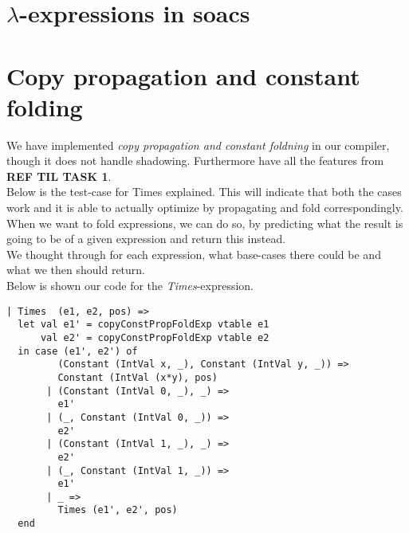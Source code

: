 \documentclass[paper=a4, fontsize=11pt]{scrartcl} %
\numberwithin{equation}{section} %
\numberwithin{figure}{section} %
\numberwithin{table}{section} %
\begin{document}
\section{$\lambda$-expressions in soacs}

\section{Copy propagation and constant folding}

	We have implemented \textit{copy propagation and constant foldning} in our compiler, though it does not handle shadowing. Furthermore have all the features from \textbf{REF TIL TASK 1}.\\
Below is the test-case for Times  explained. This will indicate that both the cases work and it is able to actually optimize by propagating and fold correspondingly.\\

When we want to fold expressions, we can do so, by predicting what the result is going to be of a given expression and return this instead.\\
We thought through for each expression, what base-cases there could be and what we then should return.\\

Below is shown our code for the \textit{Times}-expression. 
\begin{lstlisting}
| Times  (e1, e2, pos) =>
  let val e1' = copyConstPropFoldExp vtable e1
      val e2' = copyConstPropFoldExp vtable e2
  in case (e1', e2') of
         (Constant (IntVal x, _), Constant (IntVal y, _)) =>
         Constant (IntVal (x*y), pos)
       | (Constant (IntVal 0, _), _) =>
         e1'
       | (_, Constant (IntVal 0, _)) =>
         e2'
       | (Constant (IntVal 1, _), _) =>
         e2'
       | (_, Constant (IntVal 1, _)) =>
         e1'
       | _ =>
         Times (e1', e2', pos)
  end
\end{lstlisting}
\end{document}
